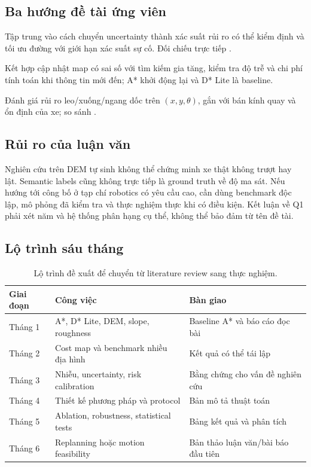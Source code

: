 \documentclass[11pt,a4paper]{article}
\begin{document}
\subsection{Ba hướng đề tài ứng viên}
\begin{description}[leftmargin=0pt,style=nextline]
\item[\textbf{A. Risk-calibrated path planning.}]
Tập trung vào cách chuyển uncertainty thành xác suất rủi ro
có thể kiểm định và tối ưu đường với giới hạn xác suất sự cố.
Đối chiếu trực tiếp \cite{benrabah2024risk,lee2023uncertainty,wang2026winter}.
\item[\textbf{B. Incremental replanning under uncertain updates.}]
Kết hợp cập nhật map có sai số với tìm kiếm gia tăng,
kiểm tra độ trễ và chi phí tính toán khi thông tin mới đến;
A* khởi động lại và D* Lite là baseline.
\item[\textbf{C. Direction-dependent vehicle-aware planning.}]
Đánh giá rủi ro leo/xuống/ngang dốc trên \((x,y,\theta)\),
gắn với bán kính quay và ổn định của xe;
so sánh \cite{feng2025constraint,gai2026framework}.
\end{description}

\subsection{Rủi ro của luận văn}
Nghiên cứu trên DEM tự sinh không thể chứng minh xe thật
không trượt hay lật. Semantic labels cũng không trực tiếp là
ground truth về độ ma sát. Nếu hướng tới công bố ở tạp chí
robotics có yêu cầu cao, cần dùng benchmark độc lập,
mô phỏng đã kiểm tra và thực nghiệm thực khi có điều kiện.
Kết luận về Q1 phải xét năm và hệ thống phân hạng cụ thể,
không thể bảo đảm từ tên đề tài.

\subsection{Lộ trình sáu tháng}
\begin{table}[htbp]
\centering\small
\caption{Lộ trình đề xuất để chuyển từ literature review sang thực nghiệm.}
\begin{tabularx}{\textwidth}{@{}p{1.9cm}Yp{4.1cm}@{}}
\toprule
Giai đoạn & Công việc & Bàn giao \\
\midrule
Tháng 1 & A*, D* Lite, DEM, slope, roughness & Baseline A* và báo cáo đọc bài\\
Tháng 2 & Cost map và benchmark nhiều địa hình & Kết quả có thể tái lập\\
Tháng 3 & Nhiễu, uncertainty, risk calibration & Bằng chứng cho vấn đề nghiên cứu\\
Tháng 4 & Thiết kế phương pháp và protocol & Bản mô tả thuật toán\\
Tháng 5 & Ablation, robustness, statistical tests & Bảng kết quả và phân tích\\
Tháng 6 & Replanning hoặc motion feasibility & Bản thảo luận văn/bài báo đầu tiên\\
\bottomrule
\end{tabularx}
\end{table}
\end{document}
